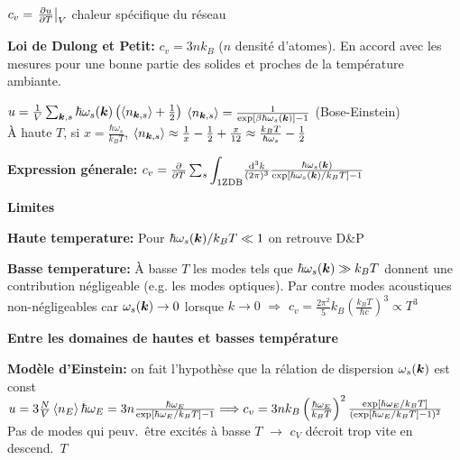 \begin{squishlist}
    \item $c_v = \left.\D{T}{u}\right|_V$ chaleur spécifique du réseau
    \item \textbf{Loi de Dulong et Petit:} $c_v = 3n k_B$ ($n$ densité d'atomes). En accord avec les mesures pour une bonne partie des solides et proches de la température ambiante.
    \item $u = \frac{1}{V} \sum_{\vk,s} \hbar \omega_s(\vk) \left( \braket{n_{\vk,s}}+\frac{1}{2}\right)$ \quad $\braket{n_{\vk,s}} = \frac{1}{\exp[\beta \hbar \omega_s(\vk)]-1}$ (Bose-Einstein) \\
    À haute $T$, si $x = \frac{\hbar \omega_s}{k_B T}$, $\braket{n_{\vk,s}} \approx \frac{1}{x} - \frac{1}{2} + \frac{x}{12} \approx \frac{k_BT}{\hbar \omega_s} - \frac{1}{2}$
    
    \item \textbf{Expression génerale:} $c_v = \D{T}{} \sum_s {\displaystyle\int_{\text{1ZDB}}} \frac{\ud^3 k}{(2\pi)^3} \frac{\hbar \omega_s(\vk)}{\exp[\hbar \omega_s(\vk)/k_B T]-1}$
    
    \squishline

    \textbf{Limites }
    \item \textbf{Haute temperature:} Pour $\hbar \omega_s(\vk)/k_BT \ll 1$ on retrouve D\&P
    \item \textbf{Basse temperature:} À basse $T$ les modes tels que $\hbar \omega_s(\vk) \gg k_BT$ donnent une contribution négligeable (e.g. les modes optiques). Par contre modes acoustiques non-négligeables car $\omega_s(\vk) \rightarrow 0$ lorsque $k \rightarrow 0$ $\Longrightarrow$ $c_v = \frac{2\pi^2}{5}k_B \left(\frac{k_B T}{\hbar c}\right)^3 \propto T^3$
    
    \squishline

    \textbf{Entre les domaines de hautes et basses température}

    \item \textbf{Modèle d'Einstein:} on fait l'hypothèse que la rélation de dispersion $\omega_s(\vk)$ est const \\
    $u = 3 \frac{N}{V} \braket{n_E}\hbar \omega_E = 3n \frac{\hbar \omega_E}{\exp[\hbar \omega_E/k_BT]-1} \Longrightarrow c_v = 3nk_B \left(\frac{\hbar \omega_E}{k_BT}\right)^2 \frac{\exp[\hbar \omega_E /k_BT]}{(\exp[\hbar \omega_E /k_BT] - 1)^2}$ \\
    Pas de modes qui peuv.\ être excités à basse $T$ $\rightarrow$ $c_V$ décroit trop vite en descend.\ $T$


\end{squishlist}
